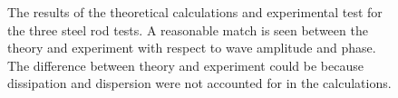  \begin{figure}
\begin{subfigmatrix}{3}
\end{subfigmatrix}

   \caption[all]
   { \label{fig:steelThExp}
The results of the theoretical calculations and experimental test for the three steel rod tests. A reasonable match is seen between the theory and experiment with respect to wave amplitude and phase. The difference between theory and experiment could be because dissipation and dispersion were not accounted for in the calculations.
 }
 \end{figure}
 
